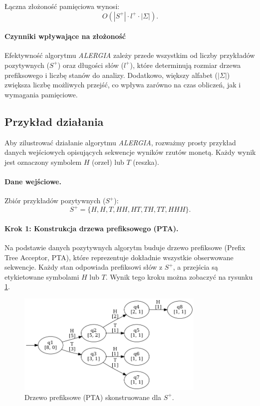 Łączna złożoność pamięciowa wynosi:  
\[
O(|S^+| \cdot l^+ \cdot |\Sigma|).
\]  

\paragraph*{Czynniki wpływające na złożoność}  
Efektywność algorytmu \textit{ALERGIA} zależy przede wszystkim od liczby przykładów pozytywnych (\( S^+ \)) oraz długości słów (\( l^+ \)), które determinują rozmiar drzewa prefiksowego i liczbę stanów do analizy. Dodatkowo, większy alfabet (\( |\Sigma| \)) zwiększa liczbę możliwych przejść, co wpływa zarówno na czas obliczeń, jak i wymagania pamięciowe. 

\subsection{Przykład działania}  
Aby zilustrować działanie algorytmu \textit{ALERGIA}, rozważmy prosty przykład danych wejściowych opisujących sekwencje wyników rzutów monetą. Każdy wynik jest oznaczony symbolem \( H \) (orzeł) lub \( T \) (reszka).

\paragraph*{Dane wejściowe.}  
Zbiór przykładów pozytywnych (\( S^+ \)):  
\[
S^+ = \{H, H, T, HH, HT, TH, TT, HHH\}.
\]  

\paragraph*{Krok 1: Konstrukcja drzewa prefiksowego (PTA).}  
Na podstawie danych pozytywnych algorytm buduje drzewo prefiksowe (Prefix Tree Acceptor, PTA), które reprezentuje dokładnie wszystkie obserwowane sekwencje. Każdy stan odpowiada prefiksowi słów z \( S^+ \), a przejścia są etykietowane symbolami \( H \) lub \( T \). Wynik tego kroku można zobaczyć na rysunku \ref{fig:alergia_example_0}. 

\begin{figure}[ht]
    \centering
    \includegraphics[width=0.8\textwidth]{images/run_example/alergia/0.png}
    \caption{Drzewo prefiksowe (PTA) skonstruowane dla \( S^+ \).}
    \label{fig:alergia_example_0}
\end{figure}

